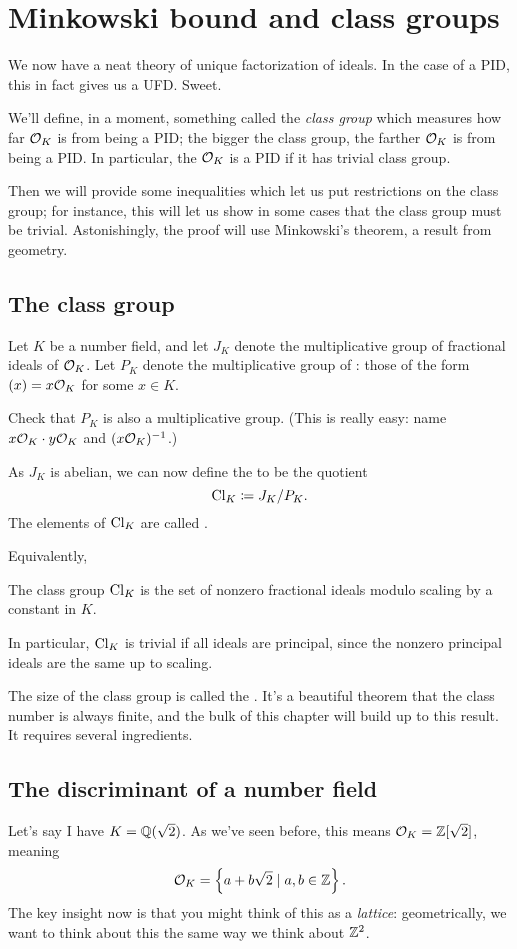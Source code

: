 \chapter{Minkowski bound and class groups}
We now have a neat theory of unique factorization of ideals.
In the case of a PID, this in fact gives us a UFD. Sweet.

We'll define, in a moment, something called the \emph{class group}
which measures how far $\mathcal O_K$ is from being a PID;
the bigger the class group, the farther $\mathcal O_K$ is from being a PID.
In particular, the $\mathcal O_K$ is a PID if it has trivial class group.

Then we will provide some inequalities which let us put restrictions on the class group;
for instance, this will let us show in some cases that the class group must be trivial.
Astonishingly, the proof will use Minkowski's theorem, a result from geometry.

\section{The class group}
Let $K$ be a number field,
and let $J_K$ denote the multiplicative group of fractional ideals of $\mathcal O_K$.
Let $P_K$ denote the multiplicative group of :
those of the form $(x) = x \mathcal O_K$ for some $x \in K$.
\begin{ques}
Check that $P_K$ is also a multiplicative group.
(This is really easy: name $x\mathcal O_K \cdot y\mathcal O_K$ and $(x\mathcal O_K)^{-1}$.)
\end{ques}
As $J_K$ is abelian, we can now define the  to be the quotient
\[ \mathrm{Cl}_K \coloneqq J_K / P_K. \]
The elements of $\mathrm{Cl}_K$ are called .

Equivalently,
\begin{moral}
The class group $\mathrm{Cl}_K$ is the set of nonzero fractional ideals modulo
scaling by a constant in $K$.
\end{moral}
In particular, $\mathrm{Cl}_K$ is trivial if all ideals are principal,
since the nonzero principal ideals are the same up to scaling.

The size of the class group is called the .
It's a beautiful theorem that the class number is always finite,
and the bulk of this chapter will build up to this result.
It requires several ingredients.


\section{The discriminant of a number field}
Let's say I have $K = \mathbb Q(\sqrt 2)$.
As we've seen before, this means $\mathcal O_K = \mathbb Z[\sqrt 2]$, meaning
\[ \mathcal O_K = \left\{ a + b \sqrt 2 \mid a,b \in \mathbb Z \right\}. \]
The key insight now is that you might think of this as a \emph{lattice}:
geometrically, we want to think about this the same way we think about $\mathbb Z^2$.

